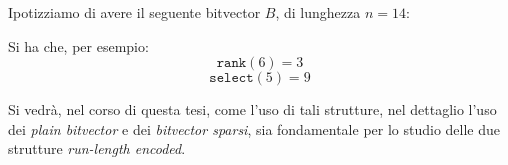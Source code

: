 \begin{esempio}
  Ipotizziamo di avere il seguente bitvector $B$, di lunghezza $n=14$:
  \begin{center}
  \end{center}
  Si ha che, per esempio:
  \[\mathtt{rank}(6)=3\]
  \[\mathtt{select}(5) =9\]
\end{esempio}
Si vedrà, nel corso di questa tesi, come l'uso di
tali strutture, nel dettaglio l'uso dei \textit{plain bitvector} e dei
\textit{bitvector sparsi}, sia fondamentale per lo studio delle due strutture
\textit{run-length encoded}.


